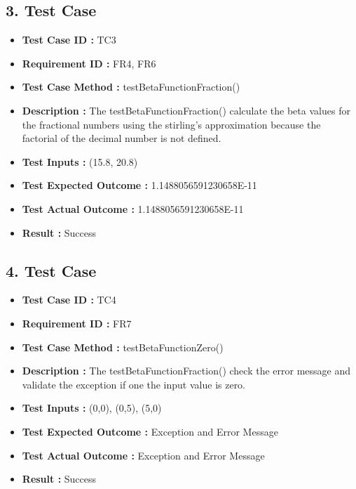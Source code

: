 \documentclass[12pt,a4paper]{report}
\begin{document}
\subsection*{3. Test Case}
    \begin{itemize}
        \item \textbf{Test Case ID : } TC3
        \item \textbf{Requirement ID : } FR4, FR6
        \item \textbf{Test Case Method : } testBetaFunctionFraction()
        \item \textbf{Description : }The testBetaFunctionFraction() calculate the beta values for the fractional numbers using the stirling's approximation because  the factorial of the decimal number is not defined.
        \item \textbf{Test Inputs : }(15.8, 20.8)
        \item \textbf{Test Expected Outcome : }1.1488056591230658E-11
        \item \textbf{Test Actual Outcome : }1.1488056591230658E-11
        \item \textbf{Result : }Success
    \end{itemize}

\subsection*{4. Test Case}
    \begin{itemize}
        \item \textbf{Test Case ID : } TC4
        \item \textbf{Requirement ID : } FR7
        \item \textbf{Test Case Method : } testBetaFunctionZero()
        \item \textbf{Description : }The testBetaFunctionFraction() check the error message and validate the exception if one the input value is zero.
        \item \textbf{Test Inputs : }(0,0), (0,5), (5,0)
        \item \textbf{Test Expected Outcome : }Exception and Error Message
        \item \textbf{Test Actual Outcome : }Exception and Error Message 
        \item \textbf{Result : }Success
    \end{itemize}
    
\end{document}
